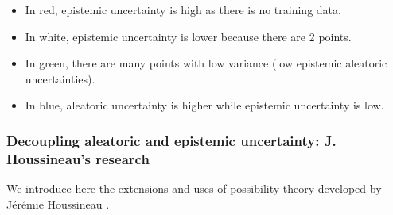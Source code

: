 \documentclass[12pt,a4paper]{article}
\theoremstyle{definition}
\theoremstyle{plain}
\begin{document}
\begin{minipage}{0.5\linewidth}
            \label{fig:uncertainty}
        \end{minipage}
        \hfill
        \begin{minipage}{0.5\linewidth}
            \begin{itemize}
                \item In red, epistemic uncertainty is high as there is no training data.
                \item In white, epistemic uncertainty is lower because there are 2 points. 
                \item In green, there are many points with low variance (low epistemic \/ aleatoric uncertainties). 
                \item In blue, aleatoric uncertainty is higher while epistemic uncertainty is low.
            \end{itemize}
        \end{minipage}




\subsubsection{Decoupling aleatoric and epistemic uncertainty: J. Houssineau's research}

We introduce here the extensions and uses of possibility theory developed by Jérémie Houssineau \cite{ipsa}. \\
\end{document}
